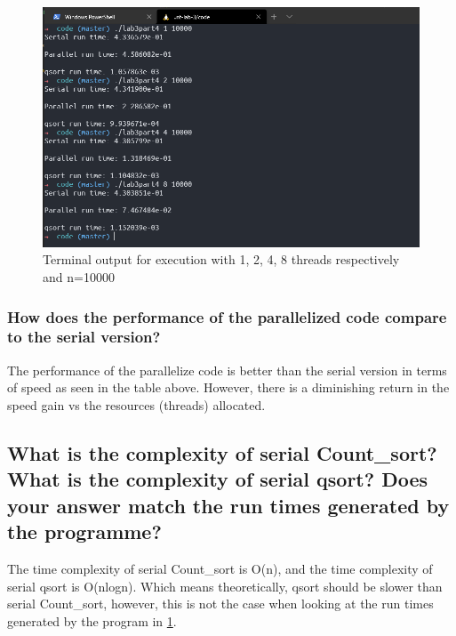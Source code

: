 \begin{figure}[ht]
	\centering
	\includegraphics[width=\textwidth]{graphics/P4_b_terminal_output.PNG}
    \caption{Terminal output for execution with 1, 2, 4, 8 threads respectively
    and n=10000}
	\label{fig:lab3part4b}
\end{figure}

\subsubsection{How does the performance of the parallelized code compare to the serial
version?}

The performance of the parallelize code is better than the serial version in terms of speed
as seen in the table above. However, there is a diminishing return in the speed gain vs 
the resources (threads) allocated.

\subsection{What is the complexity of serial Count\_sort? What is the complexity of
serial qsort? Does your answer match the run times generated by the programme?}

The time complexity of serial Count\_sort is O(n), and the time complexity of
serial qsort is O(nlogn). Which means theoretically, qsort should be slower than
serial Count\_sort, however, this is not the case when looking at the run times
generated by the program in \cref{fig:lab3part4b}.